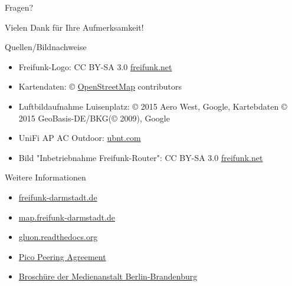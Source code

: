 \documentclass[]{beamer}
\begin{document}
\begin{frame}
\begin{center}
\Huge Fragen?
\end{center}
\end{frame}


\begin{frame}
\begin{center}
\Huge Vielen Dank für Ihre Aufmerksamkeit!
\end{center}
\end{frame}

\begin{frame}{Quellen/Bildnachweise}
\begin{itemize}
	\item Freifunk-Logo: CC BY-SA 3.0 \href{http://freifunk.net}{freifunk.net}
	\item Kartendaten: © \href{http://openstreetmap.org}{OpenStreetMap} contributors
	\item Luftbildaufnahme Luisenplatz: © 2015 Aero West, Google, Kartebdaten © 2015 GeoBasis-DE/BKG(© 2009), Google
	\item UniFi AP AC Outdoor:  \href{ubnt.com}{ubnt.com}
	\item Bild "Inbetriebnahme Freifunk-Router": CC BY-SA 3.0 \href{http://freifunk.net}{freifunk.net}
\end{itemize}
\end{frame}

\begin{frame}{Weitere Informationen}
\begin{itemize}
	\item \href{http://freifunk-darmstadt.de}{freifunk-darmstadt.de}
	\item \href{http://map.freifunk-darmstadt.de}{map.freifunk-darmstadt.de}
	\item \href{http://gluon.readthedocs.org}{gluon.readthedocs.org}
	\item \href{http://paderborn.freifunk.net/?page_id=42}{Pico Peering Agreement}
	\item \href{http://mabb.de/files/content/document/Publikationen/Freifunk-Broschuere/freifunk_publikation_webversion.pdf}{Broschüre der Medienanstalt Berlin-Brandenburg}
\end{itemize}
\end{frame}
\end{document}
